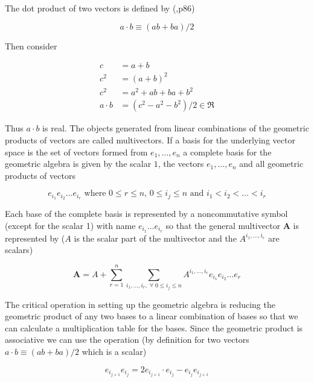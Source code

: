\documentclass[10pt]{article}
\begin{document}
The dot product of two vectors is defined by (\cite{Doran},p86)

  \begin{equation}
     a\cdot b \equiv (ab+ba)/2
  \end{equation}

Then consider

  \begin{align}
     c &= a+b \\
     c^{2} &= (a+b)^{2} \\
     c^{2} &= a^{2}+ab+ba+b^{2} \\
     a\cdot b &= (c^{2}-a^{2}-b^{2})/2 \in \Re
  \end{align}

Thus $a\cdot b$  is real.  The objects generated from linear combinations
of the geometric products of vectors are called multivectors.  If a basis for
the underlying vector space is the set of vectors formed from $e_{1},\dots,e_{n}$
a complete basis for the geometric algebra is given by the scalar $1$, the vectors $e_{1},\dots,e_{n}$
and all geometric products of vectors

   \begin{equation}
      e_{i_{1}}e_{i_{2}}\dots e_{i_{r}} \mbox{ where } 0\le r \le n\mbox{, }0 \le i_{j} \le n \mbox{ and } i_{1}<i_{2}<\dots<i_{r}
   \end{equation}

Each base of the complete basis is represented by a noncommutative symbol (except for the scalar 1)
with name $e_{i_{1}}\dots e_{i_{r}}$ so that the general multivector $\bm{A}$ is represented by
($A$ is the scalar part of the multivector and the $A^{i_{1},\dots,i_{r}}$ are scalars)

   \begin{equation}
      \bm{A} = A + \sum_{r=1}^{n}\sum_{i_{1},\dots,i_{r},\;\forall\; 0\le i_{j} \le n} A^{i_{1},\dots,i_{r}}e_{i_{1}}e_{i_{2}}\dots e_{r}
   \end{equation}

The critical operation in setting up the geometric algebra is reducing
the geometric product of any two bases to a linear combination of bases so that
we can calculate a multiplication table for the bases.  Since the geometric
product is associative we can use the operation (by definition for two vectors
$a\cdot b \equiv (ab+ba)/2$  which is a scalar)

   \begin{equation}\label{reduce}
      e_{i_{j+1}}e_{i_{j}} = 2e_{i_{j+1}}\cdot e_{i_{j}} - e_{i_{j}}e_{i_{j+1}}
   \end{equation}
\end{document}

